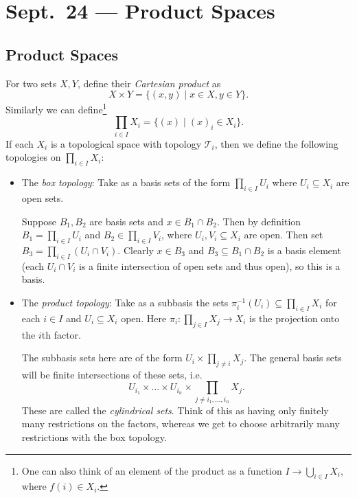\chapter{Sept.~24 --- Product Spaces}

\section{Product Spaces}
\begin{definition}
  For two sets $X, Y$, define their \emph{Cartesian product} as
  \[
    X \times Y = \{(x, y) \mid x \in X, y \in Y\}.
  \]
  Similarly we can define\footnote{One can also think of an element of the product as a function $I \to \bigcup_{i \in I} X_i$, where $f(i) \in X_i$.}
  \[
    \prod_{i \in I} X_i = \{(x) \mid (x)_i \in X_i\}.
  \]
  If each $X_i$ is a topological space
  with topology $\mathcal{T}_i$, then we define
  the following topologies on $\prod_{i \in I} X_i$:
  \begin{itemize}
    \item The \emph{box topology}: Take as a basis
      sets of the form $\prod_{i \in I} U_i$
      where $U_i \subseteq X_i$ are open sets.

      Suppose $B_1, B_2$ are basis sets and $x \in B_1 \cap B_2$.
      Then by definition $B_1 = \prod_{i \in I} U_i$ and
      $B_2 \in \prod_{i \in I} V_i$, where
      $U_i, V_i \subseteq X_i$ are open. Then
      set $B_3 = \prod_{i \in I} (U_i \cap V_i)$.
      Clearly $x \in B_3$ and $B_3 \subseteq B_1 \cap B_2$
      is a basis element (each $U_i \cap V_i$ is
      a finite intersection of open sets and thus
      open), so this is a basis.
    \item The \emph{product topology}:
      Take as a subbasis the sets
      $\pi_{i}^{-1}(U_i) \subseteq \prod_{i \in I} X_i$
      for each $i \in I$
      and $U_i \subseteq X_i$ open. Here
      $\pi_{i} : \prod_{j \in I} X_j \to X_i$
      is the projection onto the $i$th factor.

      The subbasis sets here are of the form
      $U_i \times \prod_{j \ne i} X_j$. The general
      basis sets will be finite intersections of
      these sets, i.e.
      \[
        U_{i_1} \times \dots \times U_{i_n}
        \times \prod_{j \ne i_1, \dots, i_n} X_j.
      \]
      These are called the \emph{cylindrical sets}.
      Think of this as having only finitely many
      restrictions on the factors, whereas we get
      to choose arbitrarily many restrictions with the
      box topology.
  \end{itemize}
\end{definition}

